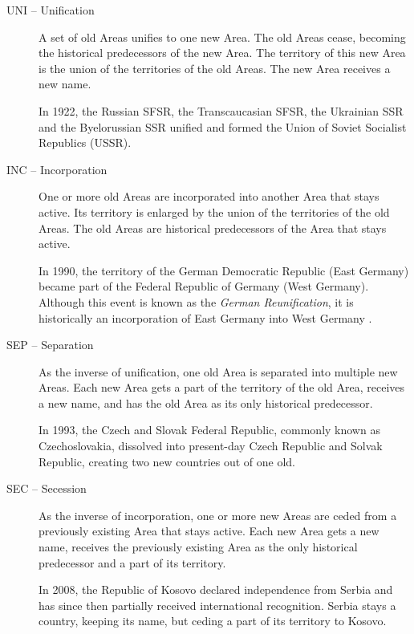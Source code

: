 \newpage
\begin{description}

  \item[UNI -- Unification]
  A set of old Areas unifies to one new Area. The old Areas cease, becoming the historical predecessors of the new Area. The territory of this new Area is the union of the territories of the old Areas. The new Area receives a new name. \\[0.25em]
  \begin{footnotesize}
    In 1922, the Russian SFSR, the Transcaucasian SFSR, the Ukrainian SSR and the Byelorussian SSR unified and formed the Union of Soviet Socialist Republics (USSR).
  \end{footnotesize}

  \item[INC -- Incorporation]
  One or more old Areas are incorporated into another Area that stays active. Its territory is enlarged by the union of the territories of the old Areas. The old Areas are historical predecessors of the Area that stays active. \\[0.25em]
  \begin{footnotesize}
    In 1990, the territory of the German Democratic Republic (East Germany) became part of the Federal Republic of Germany (West Germany). Although this event is known as the \emph{German Reunification}, it is historically an incorporation of East Germany into West Germany \cite{incorporationEastWestGermany}.
  \end{footnotesize}

  \item[SEP -- Separation]
  As the inverse of unification, one old Area is separated into multiple new Areas. Each new Area gets a part of the territory of the old Area, receives a new name, and has the old Area as its only historical predecessor. \\[0.25em]
  \begin{footnotesize}
    In 1993, the Czech and Slovak Federal Republic, commonly known as Czechoslovakia, dissolved into present-day Czech Republic and Solvak Republic, creating two new countries out of one old.
  \end{footnotesize}

  \item[SEC -- Secession]
  As the inverse of incorporation, one or more new Areas are ceded from a previously existing Area that stays active. Each new Area gets a new name, receives the previously existing Area as the only historical predecessor and a part of its territory. \\[0.25em]
  \begin{footnotesize}
    In 2008, the Republic of Kosovo declared independence from Serbia and has since then partially received international recognition. Serbia stays a country, keeping its name, but ceding a part of its territory to Kosovo.
  \end{footnotesize}


\end{description}

